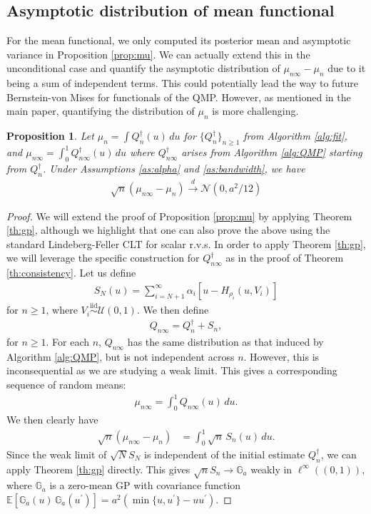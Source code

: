 \documentclass[11pt,a4paper]{article}
\newtheorem{prop}{Proposition}
\newcommand{\iid}{\overset{\mathrm{iid}}{\sim}}
\newcommand{\E}{\mathbb{E}}
\begin{document}
\begin{appendices}
\subsection{Asymptotic distribution of mean functional}\label{app:sec_munormal}
For the mean functional, we only computed its posterior mean and asymptotic variance in {Proposition \ref{prop:mu}}. We can actually extend this in the unconditional case and quantify the asymptotic distribution of
$\mu_{n\infty}- \mu_n$ due to it being a sum of independent terms. This could potentially lead the way to future Bernstein-von Mises for functionals of the QMP. However, as mentioned in the main paper, quantifying the distribution of $\mu_n$ is more challenging.
\begin{prop}\label{prop:mu_normal}
   Let $\mu_n = \int Q^{\dagger}_n(u) \, du$ for $\{Q^{\dagger}_n\}_{n \geq 1}$ from {Algorithm \ref{alg:fit}},  and $\mu_{n\infty} = \int_0^1 Q_{n\infty}^{\dagger}(u)\, du$ where $Q_{n\infty}^{\dagger}$ arises from {Algorithm \ref{alg:QMP}} starting from $Q^{\dagger}_n$. Under {Assumptions \ref{as:alpha}} and {\ref{as:bandwidth}}, we have
 \begin{align*}
   \sqrt{n}\left(\mu_{n\infty} - \mu_n\right)\overset{d}{\to}\mathcal{N}(0, a^2/12)
\end{align*}
\end{prop}
\begin{proof}
We will extend the proof of {Proposition \ref{prop:mu}} by applying {Theorem \ref{th:gp}}, although we highlight that one can also prove the above using the standard Lindeberg-Feller CLT for scalar r.v.s.
In order to apply {Theorem \ref{th:gp}}, we will leverage the specific construction for $Q_{n\infty}^{\dagger}$ as in the proof of {Theorem \ref{th:consistency}}. Let us define
 \begin{align*}
     S_N(u) = \sum_{i = N+1}^\infty \alpha_i \left[u - H_{\rho_i}\left(u,V_i\right)\right]
 \end{align*}
 for $n \geq 1$, where $V_i \iid \mathcal{U}(0,1)$. We then define
 \begin{align*}
     Q_{n\infty} = Q_n^{\dagger} + S_n,
 \end{align*}
 for $n \geq 1$. For each $n$, $Q_{n\infty}$ has the same distribution as that induced by {Algorithm \ref{alg:QMP}}, but is not independent across $n$. However, this is inconsequential as we are studying a weak limit. This gives a corresponding sequence of random means:
 \begin{align*}
     \mu_{n\infty} = \int_0^1 Q_{n\infty}(u) \, du.
 \end{align*}
 We then clearly have
 \begin{align*}
    \sqrt{n}(\mu_{n\infty} - \mu_n) &=\int_0^1 \sqrt{n}\, S_n(u)\, du.
\end{align*}
 Since the weak limit of $\sqrt{N}S_N$ is independent of the initial estimate $Q_n^{\dagger}$, we can apply {Theorem \ref{th:gp}} directly. This gives $\sqrt{n} S_n \to \mathbb{G}_a$ weakly in $\ell^\infty((0,1))$, where $\mathbb{G}_a$ is a zero-mean GP with covariance function
$\E\left[\mathbb{G}_a(u)\, \mathbb{G}_a(u^{\prime})\right] = a^2 (\min\{u,u^{\prime}\} - uu^{\prime})$.


\end{proof}
\end{appendices}
\end{document}
